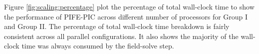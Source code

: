 \documentclass{siamart171218}
\begin{document}
Figure \ref{fig:scaling:percentage}
plot the percentage of total wall-clock time 
to show the performance of PIFE-PIC
across different number of processors for Group I and Group II.
The percentage of total wall-clock time breakdown
is fairly consistent across all parallel configurations.
It also shows the majority of the wall-clock time
was always consumed by the field-solve step.



%
\end{document}
